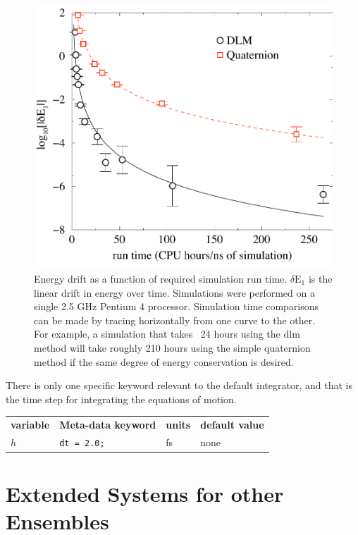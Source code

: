 \documentclass[]{book}
\begin{document}
\begin{figure}
\centering
\includegraphics[width=\linewidth]{compCost.pdf}
\caption[Energy drift as a function of required simulation run 
time]{Energy drift as a function of required simulation run time.
$\delta \mathrm{E}_1$ is the linear drift in energy over time.
Simulations were performed on a single 2.5 GHz Pentium 4
processor. Simulation time comparisons can be made by tracing
horizontally from one curve to the other. For example, a simulation
that takes ~24 hours using the {\sc dlm} method will take roughly 210
hours using the simple quaternion method if the same degree of energy
conservation is desired.}
\label{cpuCost}
\end{figure}

There is only one specific keyword relevant to the default integrator,
and that is the time step for integrating the equations of motion.

\begin{center}
\begin{tabular}{llll}
{\bf variable} & {\bf Meta-data keyword} & {\bf units} & {\bf
default value} \\  
$h$ & {\tt dt = 2.0;} & fs & none 
\end{tabular}
\end{center}

\section{\label{sec:extended}Extended Systems for other Ensembles}
\end{document}
